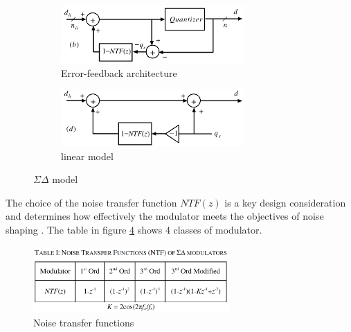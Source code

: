 \documentclass[11pt,a4paper]{article}
\begin{document}
\begin{figure}[H]
	\centering
	\begin{subfigure}[b]{0.45\textwidth}
		\centering
		\includegraphics[width=70mm]{images/errorfeedback.png}
		\caption{Error-feedback architecture}
		\label{error}
	\end{subfigure}
	\begin{subfigure}[b]{0.45\textwidth}
		\centering
		\includegraphics[width=70mm]{images/linearmodel.png}
		\caption{linear model}
		\label{linear}
	\end{subfigure}
	\caption{$\Sigma\Delta$ model}
	\label{model}
\end{figure}
The choice of the noise transfer function $NTF(z)$ is a key design consideration and determines how effectively the modulator meets the objectives of noise shaping \cite{norris2008quantization}. The table in figure \ref{table1} shows 4 classes of modulator. 
\begin{figure}[H]
	\centering
	\includegraphics[width=75mm]{images/noiseshapertf.png}
	\caption{Noise transfer functions}
	\label{table1}
\end{figure}
\end{document}
